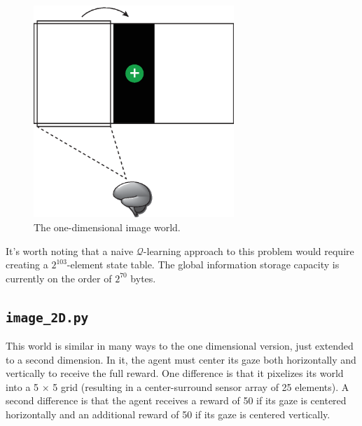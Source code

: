 \begin{figure}
\centering
\includegraphics[height=8cm]{figs/image_world_1D.eps}
\caption{The one-dimensional image world.}
\label{image_1D}
\end{figure}

It's worth noting that a naive $\mathcal{Q}$-learning approach to this problem would require creating a $2^{103}$-element state table. The global information storage capacity is currently on the order of $2^{70}$ bytes.

\subsection{\texttt{image\_2D.py}}

This world is similar in many ways to the one dimensional version, just extended to a second dimension. In it, the agent must center its gaze both horizontally and vertically to receive the full reward. One difference is that it pixelizes its world into a 5 $\times$ 5 grid (resulting in a center-surround sensor array of 25 elements). A second difference is that the agent receives a reward of 50 if its gaze is centered horizontally and an additional reward of 50 if its gaze is centered vertically. 

